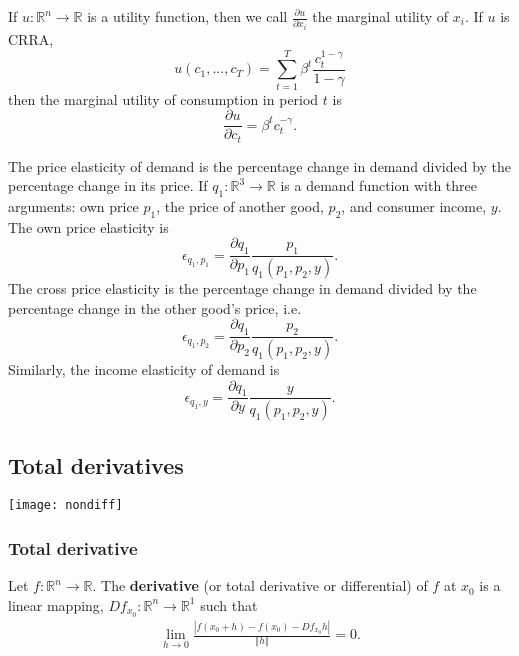 \documentclass[compress]{beamer}
\def\R{\mathbb{R}}
\newcommand{\norm}[1]{\left\Vert {#1} \right\Vert}
\renewcommand{\to}{{\rightarrow}}
\begin{document}
\begin{frame}
\begin{example}
  If $u:\R^n \to \R$ is a utility function, then we call
  $\frac{\partial u}{\partial x_i}$ the marginal utility of $x_i$.  
  If $u$ is CRRA, 
  \[u(c_1,...,c_T) =
  \sum_{t=1}^T \beta^t \frac{c_t^{1-\gamma}}{1-\gamma} \]
  then  the marginal utility of consumption in period $t$ is 
  \[ \frac{\partial u}{\partial c_t} = \beta^t c_t^{-\gamma}. \]
\end{example}
\end{frame}

\begin{frame}
\begin{example}
  The price elasticity of demand is the percentage change in demand
  divided by the percentage change in its price. If $q_1:\R^3 \to \R$ is
  a demand function with three arguments: own price $p_1$, the price
  of another good, $p_2$, and consumer income, $y$.  The own price
  elasticity is 
  \[ \epsilon_{q_1,p_1} = \frac{\partial q_1}{\partial p_1}
  \frac{p_1}{q_1(p_1,p_2,y)}. \]
  The cross price elasticity is the percentage change in demand
  divided by the percentage change in the other good's price, i.e.
  \[ \epsilon_{q_1,p_2} = \frac{\partial q_1}{\partial p_2}
  \frac{p_2}{q_1(p_1,p_2,y)}. \]
  Similarly, the income elasticity of demand is
  \[ \epsilon_{q_1,y} = \frac{\partial q_1}{\partial y}
  \frac{y}{q_1(p_1,p_2,y)}. \]
\end{example}
\end{frame}

\subsection{Total derivatives}

\begin{frame}
  \texttt{[image: nondiff]}
\end{frame}

\begin{frame}
  \frametitle{Total derivative}
  \begin{definition}
    Let $f: \R^n \to \R$. The \textbf{derivative} (or total derivative
    or differential) of $f$ at $x_0$ is a linear mapping, $Df_{x_0}:
    \R^n \to \R^1$ such that
    \begin{align*}
      \lim_{h \to 0} \frac{\left|f(x_0 + h) - f(x_0) - Df_{x_0} h\right|} {\norm{h}}
      = 0.
    \end{align*}
  \end{definition}
\end{frame}
\end{document}
